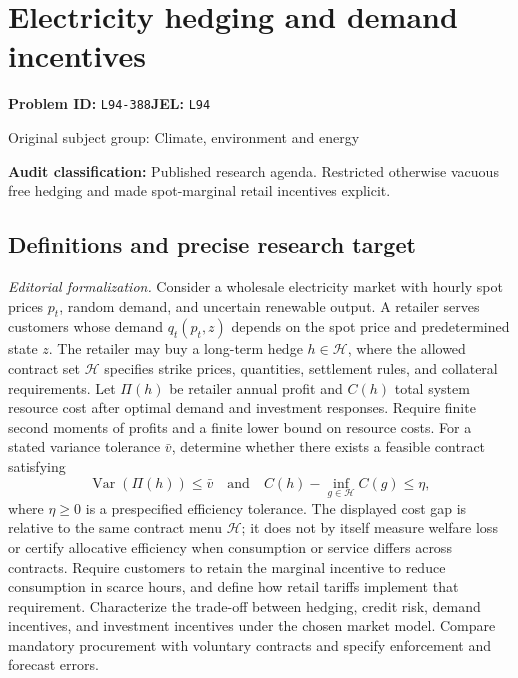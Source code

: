 \documentclass[11pt,a4paper]{article}
\begin{document}
\section*{Electricity hedging and demand incentives}
\textbf{Problem ID:} \texttt{L94-388}\quad \textbf{JEL:} \texttt{L94}\par
\label{problem:OP-0438}
{\sffamily\small\color{muted}Original subject group: Climate, environment and energy\par}
\label{definitions:problem:30007720}
\textbf{Audit classification:} Published research agenda. Restricted otherwise vacuous free hedging and made spot-marginal retail incentives explicit.
\subsection*{Definitions and precise research target}
\textit{Editorial formalization.} Consider a wholesale electricity market with hourly spot prices \(p_t\), random demand, and uncertain renewable output. A retailer serves customers whose demand \(q_t(p_t,z)\) depends on the spot price and predetermined state \(z\). The retailer may buy a long-term hedge \(h\in\mathcal H\), where the allowed contract set \(\mathcal H\) specifies strike prices, quantities, settlement rules, and collateral requirements. Let \(\Pi(h)\) be retailer annual profit and \(C(h)\) total system resource cost after optimal demand and investment responses. Require finite second moments of profits and a finite lower bound on resource costs. For a stated variance tolerance \(\bar v\), determine whether there exists a feasible contract satisfying
\[\operatorname{Var}(\Pi(h))\leq\bar v\quad\text{and}\quad C(h)-\inf_{g\in\mathcal H}C(g)\leq\eta,\]
where \(\eta\geq0\) is a prespecified efficiency tolerance. The displayed cost gap is relative to the same contract menu \(\mathcal H\); it does not by itself measure welfare loss or certify allocative efficiency when consumption or service differs across contracts. Require customers to retain the marginal incentive to reduce consumption in scarce hours, and define how retail tariffs implement that requirement. Characterize the trade-off between hedging, credit risk, demand incentives, and investment incentives under the chosen market model. Compare mandatory procurement with voluntary contracts and specify enforcement and forecast errors.
\end{document}
